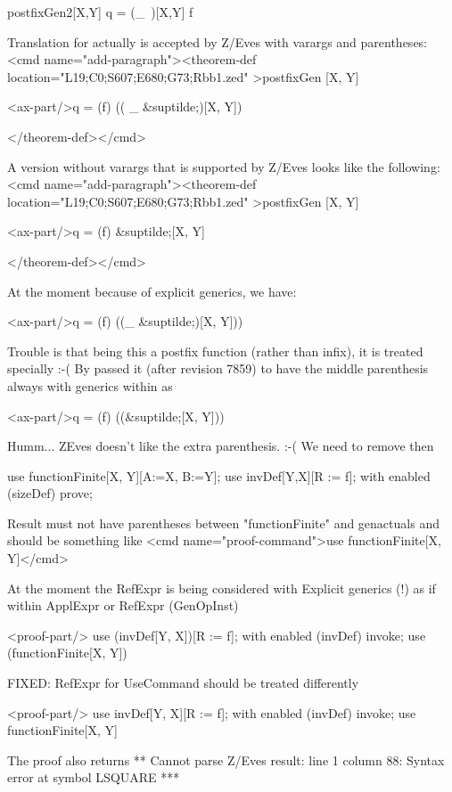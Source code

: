 \begin{theorem}{postfixGen2}[X,Y]
    q = (\_~\inv)[X,Y] f
\end{theorem}
Translation for \inv actually is accepted by Z/Eves with varargs and parentheses:
<cmd name="add-paragraph"><theorem-def location="L19;C0;S607;E680;G73;Rbb1.zed"   >postfixGen
[X, Y]

<ax-part/>q  =  (f) (( _ &suptilde;)[X, Y])

</theorem-def></cmd>


 A version without varargs that is supported by Z/Eves looks like the following:
<cmd name="add-paragraph"><theorem-def location="L19;C0;S607;E680;G73;Rbb1.zed"   >postfixGen
[X, Y]

<ax-part/>q  =  (f) &suptilde;[X, Y]

</theorem-def></cmd>


 At the moment because of explicit generics, we have:

<ax-part/>q  =  (f) ((_ &suptilde;)[X, Y]))

Trouble is that being this a postfix function (rather than infix), it is treated specially :-(
By passed it (after revision 7859) to have the middle parenthesis always with generics within as

<ax-part/>q  =  (f) ((&suptilde;[X, Y]))

Humm... ZEves doesn't like the extra parenthesis. :-( We need to remove then

\begin{zproof}[postfixGen]
use functionFinite[X, Y][A:=X, B:=Y];
use invDef[Y,X][R := f];
with enabled (sizeDef) prove;
\end{zproof}

Result must not have parentheses between "functionFinite" and genactuals and should be something like
<cmd name="proof-command">use functionFinite[X, Y]</cmd>

At the moment the RefExpr is being considered with Explicit generics (!) as if within ApplExpr or RefExpr (GenOpInst)

<proof-part/>
use (invDef[Y, X])[R := f];
with enabled (invDef) invoke;
use (functionFinite[X, Y])

FIXED: RefExpr for UseCommand should be treated differently

<proof-part/> use invDef[Y, X][R := f];
with enabled (invDef) invoke;
use functionFinite[X, Y]

The proof also returns
**
Cannot parse Z/Eves result:
line 1 column 88: Syntax error at symbol LSQUARE
***


